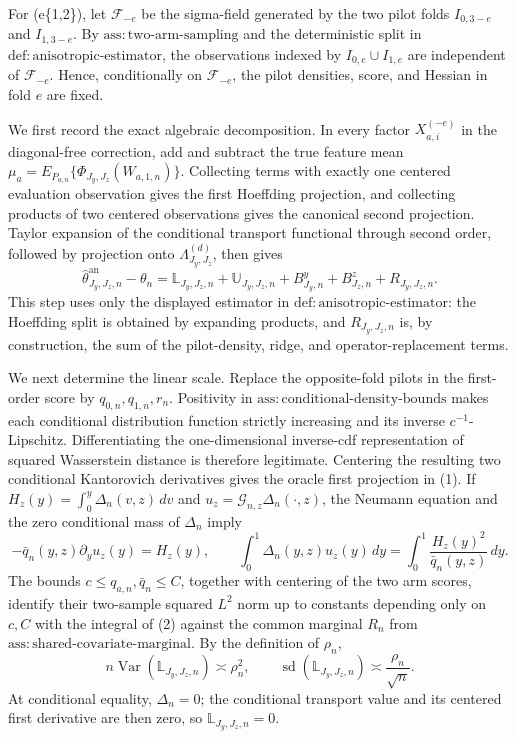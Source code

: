 For (e\in\{1,2\}), let \(\mathscr F_{-e}\) be the sigma-field generated by the two pilot folds \(I_{0,3-e}\) and \(I_{1,3-e}\).  By \(\mathrm{ass{:}two\text{-}arm\text{-}sampling}\) and the deterministic split in \(\mathrm{def{:}anisotropic\text{-}estimator}\), the observations indexed by \(I_{0,e}\cup I_{1,e}\) are independent of \(\mathscr F_{-e}\).  Hence, conditionally on \(\mathscr F_{-e}\), the pilot densities, score, and Hessian in fold \(e\) are fixed.

We first record the exact algebraic decomposition.  In every factor \(X_{a,i}^{(-e)}\) in the diagonal-free correction, add and subtract the true feature mean \(\mu_{a}=E_{P_{a,n}}\{\Phi_{J_y,J_z}(W_{a,1,n})\}\).  Collecting terms with exactly one centered evaluation observation gives the first Hoeffding projection, and collecting products of two centered observations gives the canonical second projection.  Taylor expansion of the conditional transport functional through second order, followed by projection onto \(\Lambda_{J_y,J_z}^{(d)}\), then gives
\[
\widehat\theta^{\mathrm{an}}_{J_y,J_z,n}-\theta_n
=\mathbb L_{J_y,J_z,n}+\mathbb U_{J_y,J_z,n}
+B^y_{J_y,n}+B^z_{J_z,n}+R_{J_y,J_z,n}.                                  \tag{1}
\]
This step uses only the displayed estimator in \(\mathrm{def{:}anisotropic\text{-}estimator}\): the Hoeffding split is obtained by expanding products, and \(R_{J_y,J_z,n}\) is, by construction, the sum of the pilot-density, ridge, and operator-replacement terms.

We next determine the linear scale.  Replace the opposite-fold pilots in the first-order score by \(q_{0,n},q_{1,n},r_n\).  Positivity in \(\mathrm{ass{:}conditional\text{-}density\text{-}bounds}\) makes each conditional distribution function strictly increasing and its inverse \(c^{-1}\)-Lipschitz.  Differentiating the one-dimensional inverse-cdf representation of squared Wasserstein distance is therefore legitimate.  Centering the resulting two conditional Kantorovich derivatives gives the oracle first projection in (1).  If \(H_z(y)=\int_0^y\Delta_n(v,z)\,dv\) and \(u_z=\mathcal G_{n,z}\Delta_n(\cdot,z)\), the Neumann equation and the zero conditional mass of \(\Delta_n\) imply
\[
-\bar q_n(y,z)\partial_yu_z(y)=H_z(y),
\qquad
\int_0^1\Delta_n(y,z)u_z(y)\,dy
=\int_0^1\frac{H_z(y)^2}{\bar q_n(y,z)}\,dy.                              \tag{2}
\]
The bounds \(c\le q_{a,n},\bar q_n\le C\), together with centering of the two arm scores, identify their two-sample squared \(L^2\) norm up to constants depending only on \(c,C\) with the integral of (2) against the common marginal \(R_n\) from \(\mathrm{ass{:}shared\text{-}covariate\text{-}marginal}\).  By the definition of \(\rho_n\),
\[
n\operatorname{Var}(\mathbb L_{J_y,J_z,n})\asymp \rho_n^2,
\qquad
\operatorname{sd}(\mathbb L_{J_y,J_z,n})\asymp\frac{\rho_n}{\sqrt n}.    \tag{3}
\]
At conditional equality, \(\Delta_n=0\); the conditional transport value and its centered first derivative are then zero, so \(\mathbb L_{J_y,J_z,n}=0\).

